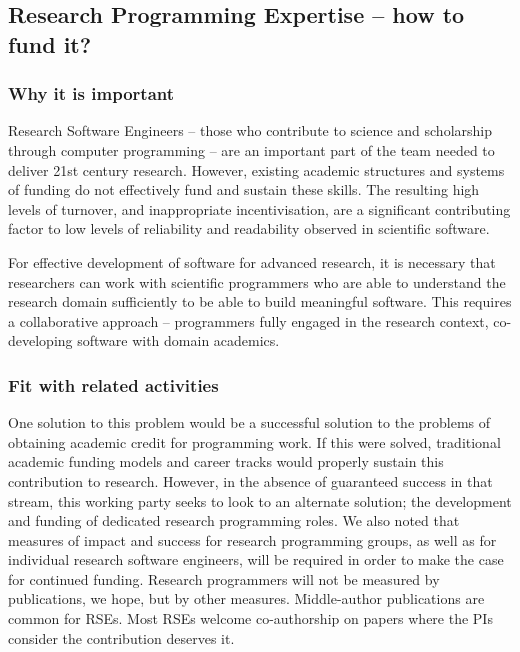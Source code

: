 \subsection{Research Programming Expertise -- how to fund it?}
\label{RSE}

\subsubsection{Why it is important}

Research Software Engineers -- those who contribute to science and scholarship
through computer programming -- are an important part of the team
needed to deliver 21st century research. However, existing academic structures
and systems of funding do not effectively fund and sustain these skills.
The resulting high levels of turnover, and inappropriate incentivisation,
are a significant contributing factor to low levels of reliability and
readability observed in scientific software.

For effective development of software for advanced research, it is necessary
that researchers can work with scientific programmers who are able to understand
the research domain sufficiently to be able to build meaningful software. This
requires a collaborative approach -- programmers fully engaged in the research
context, co-developing software with domain academics.

\subsubsection{Fit with related activities}

One solution to this problem would be a successful solution to the problems of
obtaining academic credit for programming work. If this were solved, traditional
academic funding models and career tracks would properly sustain this
contribution to research. However, in the absence of guaranteed success in that
stream, this working party seeks to look to an alternate solution; the
development and funding of dedicated research programming roles. We also noted
that measures of impact and success for research programming
groups, as well as for individual research software engineers, will be required
in order to make the case for continued funding. Research programmers will not
be measured by publications, we hope, but by other measures. Middle-author
publications are common for RSEs. Most RSEs welcome co-authorship on papers
where the PIs consider the contribution deserves it.

